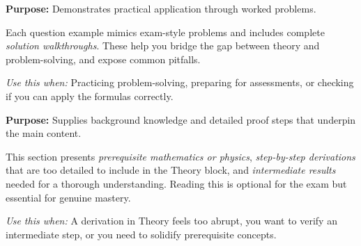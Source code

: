 \noindent
\begin{minipage}{0.9\textwidth}
  \begin{tcolorbox}[breakable, colback=GreenBG, colframe=ForestGreen,
                     arc=3pt,
                     before upper={\textcolor{ForestGreen}{\textbf{\scshape Question Examples}}\par\smallskip}]
    \textbf{Purpose:} Demonstrates practical application through worked problems.

    Each question example mimics exam-style problems and includes complete
    \emph{solution walkthroughs}. These help you bridge the gap between theory
    and problem-solving, and expose common pitfalls.

    \smallskip
    \textit{Use this when:} Practicing problem-solving, preparing for assessments,
    or checking if you can apply the formulas correctly.
  \end{tcolorbox}
\end{minipage}

\bigskip

\noindent
\begin{minipage}{0.9\textwidth}
  \begin{tcolorbox}[breakable, colback=PurpleBG, colframe=AmethystPurple,
                     leftrule=4pt, arc=0pt,
                     before upper={\textcolor{AmethystPurple}{\textbf{\scshape Foundation}}\par\smallskip}]
    \textbf{Purpose:} Supplies background knowledge and detailed proof steps
    that underpin the main content.

    This section presents \emph{prerequisite mathematics or physics},
    \emph{step-by-step derivations} that are too detailed to include in the Theory block,
    and \emph{intermediate results} needed for a thorough understanding.
    Reading this is optional for the exam but essential for genuine mastery.

    \smallskip
    \textit{Use this when:} A derivation in Theory feels too abrupt, you want to verify
    an intermediate step, or you need to solidify prerequisite concepts.
  \end{tcolorbox}
\end{minipage}

\bigskip

